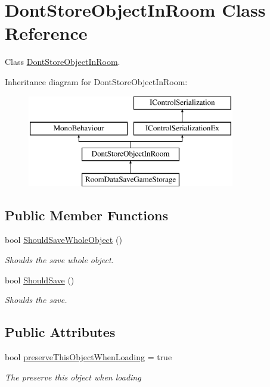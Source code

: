 \hypertarget{class_dont_store_object_in_room}{}\section{Dont\+Store\+Object\+In\+Room Class Reference}
\label{class_dont_store_object_in_room}


Class \hyperlink{class_dont_store_object_in_room}{Dont\+Store\+Object\+In\+Room}.  


Inheritance diagram for Dont\+Store\+Object\+In\+Room\+:\begin{figure}[H]
\begin{center}
\leavevmode
\includegraphics[height=4.000000cm]{class_dont_store_object_in_room}
\end{center}
\end{figure}
\subsection*{Public Member Functions}
\begin{DoxyCompactItemize}
\item 
bool \hyperlink{class_dont_store_object_in_room_ae64064ac5b1759f7a5694a4f617a03ed}{Should\+Save\+Whole\+Object} ()
\begin{DoxyCompactList}\small\item\em Shoulds the save whole object. \end{DoxyCompactList}\item 
bool \hyperlink{class_dont_store_object_in_room_a710cc83ab8e061a58175a2c5bf3afa89}{Should\+Save} ()
\begin{DoxyCompactList}\small\item\em Shoulds the save. \end{DoxyCompactList}\end{DoxyCompactItemize}
\subsection*{Public Attributes}
\begin{DoxyCompactItemize}
\item 
bool \hyperlink{class_dont_store_object_in_room_a64b5902d6e6b768a25925edc74c4782d}{preserve\+This\+Object\+When\+Loading} = true
\begin{DoxyCompactList}\small\item\em The preserve this object when loading \end{DoxyCompactList}\end{DoxyCompactItemize}


